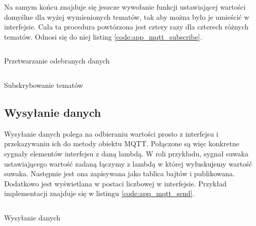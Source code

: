         Na samym końcu znajduje się jeszcze wywołanie funkcji ustawiającej wartości domyślne dla wyżej wymienionych tematów, tak aby można było je umieścić w interfejsie. Cała ta procedura powtórzona jest cztery razy dla czterech różnych tematów. Odnosi się do niej listing \ref{code:app_mqtt_subscribe}. 

        
        \begin{kod}
          \inputminted[firstline=245, lastline=254]{cpp}{app/listings/mainwindow.cpp}
          \caption{Przetwarzanie odebranych danych}
          \label{code:app_mqtt_setValue}
        \end{kod}
        
      
        \begin{kod}
          \inputminted[firstline=186, lastline=205]{cpp}{app/listings/mainwindow.cpp}
          \caption{Subskrybowanie tematów}
          \label{code:app_mqtt_subscribe}
          \vspace{1em}
        \end{kod}
        
        
      \subsection{Wysyłanie danych}
        Wysyłanie danych polega na odbieraniu wartości prosto z interfejsu i przekazywaniu ich do metody obiektu MQTT. Połączone są więc konkretne sygnały elementów interfejsu z daną lambdą. W roli przykładu, sygnał suwaka ustawiającego wartość zadaną łączymy z lambdą w której wyłuskujemy wartość suwaka. Następnie jest ona zapisywana jako tablica bajtów i publikowana. Dodatkowo jest wyświetlana w postaci liczbowej w interfejsie. Przykład implementacji znajduje się w listingu \ref{code:app_mqtt_send}.
        
        \begin{kod}
          \inputminted[firstline=208, lastline=235]{cpp}{app/listings/mainwindow.cpp}
          \caption{Wysyłanie danych}
          \label{code:app_mqtt_send}
          \vspace{2em}
        \end{kod}       
        